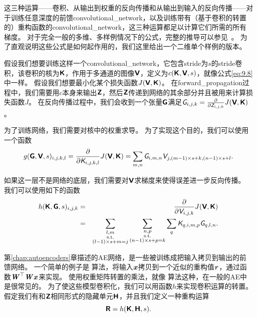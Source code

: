 这三种运算——卷积、从输出到权重的反向传播和从输出到输入的反向传播——对于训练任意深度的前馈\gls{convolutional_network}，以及训练带有（基于卷积的转置的）重构函数的\gls{convolutional_network}，这三种运算都足以计算它们所需的所有梯度。
对于完全一般的多维、多样例情况下的公式，完整的推导可以参见~\cite{Goodfellow-TR2010}。 
为了直观说明这些公式是如何起作用的，我们这里给出一个二维单个样例的版本。
 
 
假设我们想要训练这样一个\gls{convolutional_network}，它包含\gls{stride}为$s$的\gls{stride}卷积，该卷积的核为$\textsf{\textbf{K}}$，作用于多通道的图像$\textsf{\textbf{V}}$，定义为$c(\textsf{\textbf{K}}, \textsf{\textbf{V}}, s)$，就像公式\ref{eq:9.8}中一样。
假设我们想要最小化某个损失函数$J(\textsf{\textbf{V}}, \textsf{\textbf{K}})$。
在\gls{forward_propagation}过程中，我们需要用$c$本身来输出$\textsf{\textbf{Z}}$，然后$\textsf{\textbf{Z}}$传递到网络的其余部分并且被用来计算损失函数$J$。
在反向传播过程中，我们会收到一个张量$\textsf{\textbf{G}}$满足$\textit{\textsf{G}}_{i, j, k} = \frac{\partial}{\partial \textit{\textsf{Z}}_{i, j, k}} J(\textsf{\textbf{V}}, \textsf{\textbf{K}})$。

为了训练网络，我们需要对核中的权重求导。
为了实现这个目的，我们可以使用一个函数
\begin{equation}
g(\textsf{\textbf{G}}, \textsf{\textbf{V}}, s)_{i, j, k, l} = \frac{\partial}{\partial \textit{\textsf{K}}_{i, j, k, l}} J(\textsf{\textbf{V}}, \textsf{\textbf{K}}) = \sum_{m, n} \textit{\textsf{G}}_{i, m, n} \textit{\textsf{V}}_{j, (m-1)\times s+k, (n-1)\times s+l}.
\end{equation}

如果这一层不是网络的底层，我们需要对$\textsf{\textbf{V}}$求梯度来使得误差进一步反向传播。
我们可以使用如下的函数
\begin{eqnarray}
h(\textsf{\textbf{K}}, \textsf{\textbf{G}}, s)_{i, j, k} &=& \frac{\partial }{\partial \textit{\textsf{V}}_{i, j, k}} J(\textsf{\textbf{V}}, \textsf{\textbf{K}})\\
&=& \sum_{\substack{l, m\\
                  \text{s.t.}\\
                  (l-1)\times s+m = j}} \sum_{\substack{n, p\\
                                                            \text{s.t.}\\
                                                            (n-1)\times s +p = k}}
            \sum_q \textit{\textsf{K}}_{q,i,m,p} \textit{\textsf{G}}_{q, l, n}.
\end{eqnarray}

第\ref{chap:autoencoders}章描述的\gls{AE}网络，是一些被训练成把输入拷贝到输出的前馈网络。
一个简单的例子是\,\,算法，将输入$\boldsymbol{\mathit{x}}$拷贝到一个近似的重构值$\boldsymbol{\mathit{r}}$，通过函数${\boldsymbol{\mathit{W}}}^\top \boldsymbol{\mathit{W}} \boldsymbol{\mathit{x}}$来实现。
使用权重矩阵转置的乘法，就像\,\,算法这种，在一般的\gls{AE}中是很常见的。
为了使这些模型卷积化，我们可以用函数$h$来实现卷积运算的转置。
假定我们有和$\textsf{\textbf{Z}}$相同形式的隐藏单元$\textsf{\textbf{H}}$，并且我们定义一种重构运算
\begin{equation}
\textsf{\textbf{R}} = h(\textsf{\textbf{K}}, \textsf{\textbf{H}}, s).
\end{equation}

